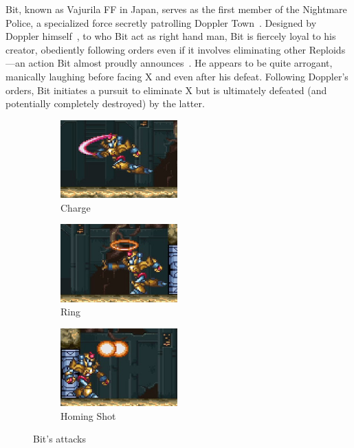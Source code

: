 Bit, known as Vajurila FF in Japan, serves as the first member of the Nightmare Police, a specialized force secretly patrolling Doppler Town~\cite{wayback:X3_resources}. Designed by Doppler himself~\cite{Xcoll1:Manual_X3}, to who Bit act as right hand man, Bit is fiercely loyal to his creator, obediently following orders even if it involves eliminating other Reploids—an action Bit almost proudly announces~\cite{wiki:Bit}. He appears to be quite arrogant, manically laughing before facing X and even after his defeat. Following Doppler's orders, Bit initiates a pursuit to eliminate X but is ultimately defeated (and potentially completely destroyed) by the latter.
\begin{figure}[htp]
	\centering
	\begin{subfigure}{.4\linewidth}
		\centering
		\includegraphics[height=3cm]{figures/X3/Enemies/bit_saber.jpg}
		\caption{Charge}
	\end{subfigure}
	\begin{subfigure}{.4\linewidth}
		\centering
		\includegraphics[height=3cm]{figures/X3/Enemies/bit_ring.jpg}
		\caption{Ring}
	\end{subfigure}
	\begin{subfigure}{.4\linewidth}
		\centering
		\includegraphics[height=3cm]{figures/X3/Enemies/bit_shot.jpg}
		\caption{Homing Shot}
	\end{subfigure}
	\caption{Bit's attacks}
\end{figure}

